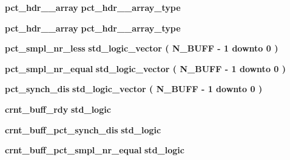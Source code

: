  \begin{DoxyCompactItemize}
\item 
{\bf pct\+\_\+hdr\+\_\+\_\+array} {\bfseries {\bfseries {\bf pct\+\_\+hdr\+\_\+\_\+array\+\_\+type}} \textcolor{vhdlchar}{ }} 
\item 
{\bf pct\+\_\+hdr\+\_\+\_\+array} {\bfseries {\bfseries {\bf pct\+\_\+hdr\+\_\+\_\+array\+\_\+type}} \textcolor{vhdlchar}{ }} 
\item 
{\bf pct\+\_\+smpl\+\_\+nr\+\_\+less} {\bfseries \textcolor{comment}{std\+\_\+logic\+\_\+vector}\textcolor{vhdlchar}{ }\textcolor{vhdlchar}{(}\textcolor{vhdlchar}{ }\textcolor{vhdlchar}{ }\textcolor{vhdlchar}{ }\textcolor{vhdlchar}{ }{\bfseries {\bf N\+\_\+\+B\+U\+FF}} \textcolor{vhdlchar}{-\/}\textcolor{vhdlchar}{ } \textcolor{vhdldigit}{1} \textcolor{vhdlchar}{ }\textcolor{keywordflow}{downto}\textcolor{vhdlchar}{ }\textcolor{vhdlchar}{ } \textcolor{vhdldigit}{0} \textcolor{vhdlchar}{ }\textcolor{vhdlchar}{)}\textcolor{vhdlchar}{ }} 
\item 
{\bf pct\+\_\+smpl\+\_\+nr\+\_\+equal} {\bfseries \textcolor{comment}{std\+\_\+logic\+\_\+vector}\textcolor{vhdlchar}{ }\textcolor{vhdlchar}{(}\textcolor{vhdlchar}{ }\textcolor{vhdlchar}{ }\textcolor{vhdlchar}{ }\textcolor{vhdlchar}{ }{\bfseries {\bf N\+\_\+\+B\+U\+FF}} \textcolor{vhdlchar}{-\/}\textcolor{vhdlchar}{ } \textcolor{vhdldigit}{1} \textcolor{vhdlchar}{ }\textcolor{keywordflow}{downto}\textcolor{vhdlchar}{ }\textcolor{vhdlchar}{ } \textcolor{vhdldigit}{0} \textcolor{vhdlchar}{ }\textcolor{vhdlchar}{)}\textcolor{vhdlchar}{ }} 
\item 
{\bf pct\+\_\+synch\+\_\+dis} {\bfseries \textcolor{comment}{std\+\_\+logic\+\_\+vector}\textcolor{vhdlchar}{ }\textcolor{vhdlchar}{(}\textcolor{vhdlchar}{ }\textcolor{vhdlchar}{ }\textcolor{vhdlchar}{ }\textcolor{vhdlchar}{ }{\bfseries {\bf N\+\_\+\+B\+U\+FF}} \textcolor{vhdlchar}{-\/}\textcolor{vhdlchar}{ } \textcolor{vhdldigit}{1} \textcolor{vhdlchar}{ }\textcolor{keywordflow}{downto}\textcolor{vhdlchar}{ }\textcolor{vhdlchar}{ } \textcolor{vhdldigit}{0} \textcolor{vhdlchar}{ }\textcolor{vhdlchar}{)}\textcolor{vhdlchar}{ }} 
\item 
{\bf crnt\+\_\+buff\+\_\+rdy} {\bfseries \textcolor{comment}{std\+\_\+logic}\textcolor{vhdlchar}{ }} 
\item 
{\bf crnt\+\_\+buff\+\_\+pct\+\_\+synch\+\_\+dis} {\bfseries \textcolor{comment}{std\+\_\+logic}\textcolor{vhdlchar}{ }} 
\item 
{\bf crnt\+\_\+buff\+\_\+pct\+\_\+smpl\+\_\+nr\+\_\+equal} {\bfseries \textcolor{comment}{std\+\_\+logic}\textcolor{vhdlchar}{ }} 

\end{DoxyCompactItemize}
